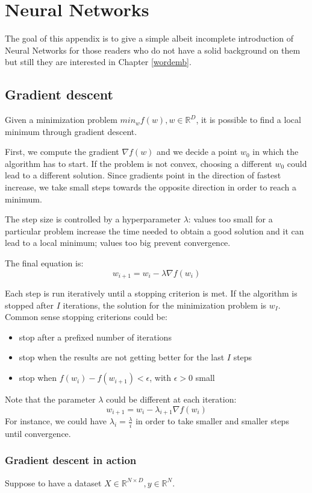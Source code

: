 \chapter{Neural Networks} \label{ann}
The goal of this appendix is to give a simple albeit incomplete introduction of
Neural Networks for those readers who do not have a solid background on them but
still they are interested in Chapter \ref{wordemb}.

\section{Gradient descent}
Given a minimization problem $min_w f(w), w \in \mathbb{R}^D$,
it is possible to find a local minimum through gradient descent.

First, we compute the gradient $\nabla f(w)$ and we decide a point $w_0$ in which the algorithm has to start.
If the problem is not convex, choosing a different $w_0$ could lead to a different
solution.
Since gradients point in the direction of fastest increase,
we take small steps towards the opposite direction in order to reach a minimum.

The step size is controlled by a hyperparameter $\lambda$:
values too small for a particular problem increase
the time needed to obtain a good solution and
it can lead to a local minimum;
values too big prevent convergence.

The final equation is:
\[ w_{i+1} = w_{i} - \lambda \nabla f(w_i) \]

Each step is run iteratively until a stopping criterion is met.
If the algorithm is stopped after $I$ iterations, the solution
for the minimization problem is $w_{I}$.
Common sense stopping criterions could be:
\begin{itemize}
    \item stop after a prefixed number of iterations
    \item stop when the results are not getting better for the last $I$ steps
    \item stop when $f(w_i) - f(w_{i+1}) < \epsilon$, with $\epsilon > 0$ small
\end{itemize}

Note that the parameter $\lambda$ could be different at each iteration:
\[ w_{i+1} = w_{i} - \lambda_{i+1} \nabla f(w_i) \]
For instance, we could have $\lambda_i = \frac{\lambda}{i}$ in order to take
smaller and smaller steps until convergence.

\subsection{Gradient descent in action} \label{gradesc}
Suppose to have a dataset $X \in \mathbb{R}^{N \times D}, y \in \mathbb{R}^N$.

